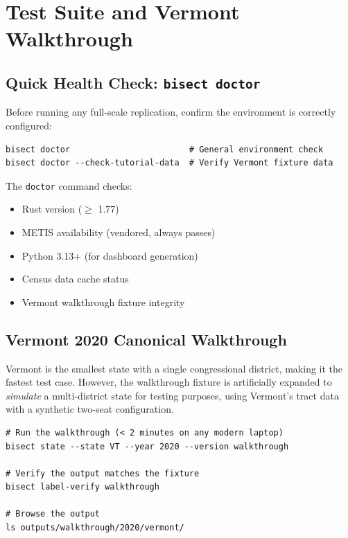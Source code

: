 
\section{Test Suite and Vermont Walkthrough}
\label{sec:testsuite}

\subsection*{Quick Health Check: \texttt{bisect doctor}}

Before running any full-scale replication, confirm the environment is
correctly configured:

\begin{verbatim}
bisect doctor                        # General environment check
bisect doctor --check-tutorial-data  # Verify Vermont fixture data
\end{verbatim}

\noindent The \texttt{doctor} command checks:
\begin{itemize}[itemsep=2pt]
  \item Rust version ($\geq$ 1.77)
  \item METIS availability (vendored, always passes)
  \item Python 3.13+ (for dashboard generation)
  \item Census data cache status
  \item Vermont walkthrough fixture integrity
\end{itemize}

\subsection*{Vermont 2020 Canonical Walkthrough}

Vermont is the smallest state with a single congressional district,
making it the fastest test case.
However, the walkthrough fixture is artificially expanded to
\textit{simulate} a multi-district state for testing purposes,
using Vermont's tract data with a synthetic two-seat configuration.

\begin{verbatim}
# Run the walkthrough (< 2 minutes on any modern laptop)
bisect state --state VT --year 2020 --version walkthrough

# Verify the output matches the fixture
bisect label-verify walkthrough

# Browse the output
ls outputs/walkthrough/2020/vermont/
\end{verbatim}

